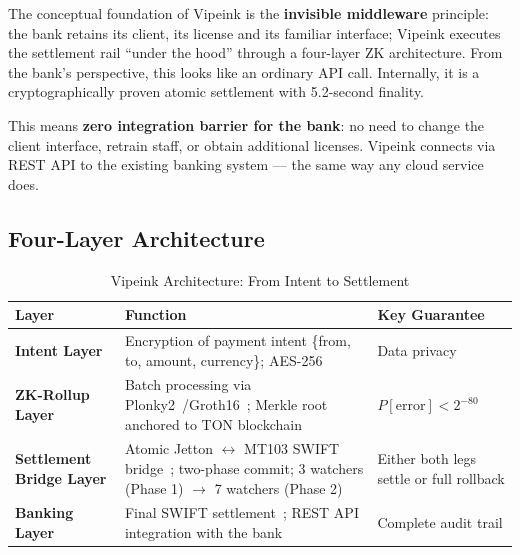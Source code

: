 \documentclass[11pt,a4paper]{article}
\begin{document}
The conceptual foundation of Vipeink is the \textbf{invisible middleware} principle: the bank retains its client, its license and its familiar interface; Vipeink executes the settlement rail ``under the hood'' through a four-layer ZK architecture. From the bank's perspective, this looks like an ordinary API call. Internally, it is a cryptographically proven atomic settlement with 5.2-second finality.

This means \textbf{zero integration barrier for the bank}: no need to change the client interface, retrain staff, or obtain additional licenses. Vipeink connects via REST API to the existing banking system --- the same way any cloud service does.

\subsection*{Four-Layer Architecture}

\begin{table}[htbp]
\centering
\caption{Vipeink Architecture: From Intent to Settlement}
\begin{tabularx}{\linewidth}{@{}p{3.8cm}Xp{3.2cm}@{}}
\toprule
\textbf{Layer} & \textbf{Function} & \textbf{Key Guarantee} \\
\midrule
\textbf{Intent Layer}     & Encryption of payment intent \{from, to, amount, currency\}; AES-256 & Data privacy \\[4pt]
\textbf{ZK-Rollup Layer}  & Batch processing via Plonky2~\cite{plonky2}/Groth16~\cite{groth16}; Merkle root anchored to TON blockchain~\cite{ton_wp}  & $P[\text{error}] < 2^{-80}$ \\[4pt]
\textbf{Settlement Bridge Layer} & Atomic Jetton $\leftrightarrow$ MT103 SWIFT bridge~\cite{swift_mt103}; two-phase commit; 3 watchers (Phase 1) $\to$ 7 watchers (Phase 2) & Either both legs settle or full rollback \\[4pt]
\textbf{Banking Layer}    & Final SWIFT settlement~\cite{swift_gpi}; REST API integration with the bank            & Complete audit trail \\
\bottomrule
\end{tabularx}
\end{table}
\end{document}
